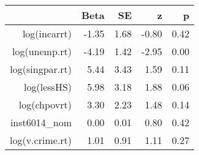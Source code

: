 \begin{table}[ht]
\centering
\begin{tabular}{rrrrr}
  \hline
 & Beta & SE & z & p \\ 
  \hline
log(incarrt) & -1.35 & 1.68 & -0.80 & 0.42 \\ 
  log(unemp.rt) & -4.19 & 1.42 & -2.95 & 0.00 \\ 
  log(singpar.rt) & 5.44 & 3.43 & 1.59 & 0.11 \\ 
  log(lessHS) & 5.98 & 3.18 & 1.88 & 0.06 \\ 
  log(chpovrt) & 3.30 & 2.23 & 1.48 & 0.14 \\ 
  inst6014\_nom & 0.00 & 0.01 & 0.80 & 0.42 \\ 
  log(v.crime.rt) & 1.01 & 0.91 & 1.11 & 0.27 \\ 
   \hline
\end{tabular}
\end{table}
